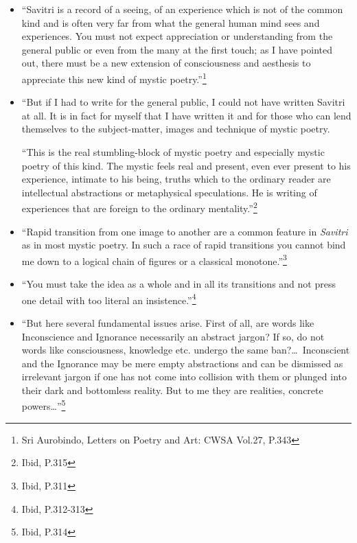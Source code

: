 \documentclass[12pt,a4paper]{book}
\begin{document}
\begin{itemize}
\renewcommand{\labelitemi}{$\diamond$}
\item ``Savitri is a record of a seeing, of an experience which is not
  of the common kind and is often very far from what the general human
  mind sees and experiences. You must not expect appreciation or
  understanding from the general public or even from the many at the
  first touch; as I have pointed out, there must be a new extension of
  consciousness and aesthesis to appreciate this new kind of mystic
  poetry.''\footnote{Sri Aurobindo, Letters on Poetry and Art: CWSA
    Vol.27, P.343}

\item ``But if I had to write for the general public, I could not have
  written Savitri at all. It is in fact for myself that I have written
  it and for those who can lend themselves to the subject-matter,
  images and technique of mystic poetry.

  ``This is the real stumbling-block of mystic poetry and especially
  mystic poetry of this kind. The mystic feels real and present, even
  ever present to his experience, intimate to his being, truths which
  to the ordinary reader are intellectual abstractions or metaphysical
  speculations. He is writing of experiences that are foreign to the
  ordinary mentality.''\footnote{Ibid, P.315}

\item ``Rapid transition from one image to another are a common
  feature in \emph{Savitri} as in most mystic poetry. In such a race
  of rapid transitions you cannot bind me down to a logical chain of
  figures or a classical monotone.''\footnote{Ibid, P.311}

\item ``You must take the idea as a whole and in all its transitions
  and not press one detail with too literal an
  insistence.''\footnote{Ibid, P.312-313}

\item ``But here several fundamental issues arise. First of all, are
  words like Inconscience and Ignorance necessarily an abstract
  jargon? If so, do not words like consciousness, knowledge
  etc. undergo the same ban?\ldots \ Inconscient and the Ignorance may
  be mere empty abstractions and can be dismissed as irrelevant jargon
  if one has not come into collision with them or plunged into their
  dark and bottomless reality. But to me they are realities, concrete
  powers\ldots''\footnote{Ibid, P.314}


\end{itemize}
\end{document}
